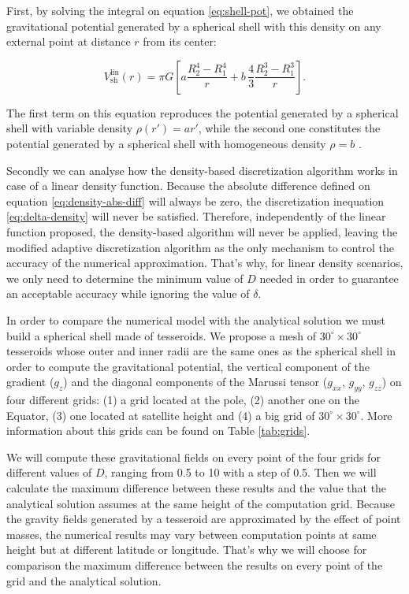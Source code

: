\documentclass[extra]{gji}
\begin{document}
First, by solving the integral on equation \ref{eq:shell-pot}, we obtained the
gravitational potential generated by a spherical shell with this density on
any external point at distance $r$ from its center:

\begin{equation}
    V_\text{sh}^\text{lin}(r) = \pi G \left[
    a \frac{R_2^4 - R_1^4}{r} +
    b \,\frac{4}{3} \frac{R_2^3 - R_1^3}{r} \right].
    \label{eq:shell-pot-linear}
\end{equation}

\noindent The first term on this equation reproduces the potential generated
by a spherical shell with variable density $\rho(r') = ar'$, while the second
one constitutes the potential generated by a spherical shell with homogeneous
density $\rho = b$ \citep{Mikuska2006,Grombein2013}.

Secondly we can analyse how the density-based discretization algorithm
works in case of a linear density function.
Because the absolute difference defined on equation
\ref{eq:density-abs-diff} will always be zero, the discretization
inequation \ref{eq:delta-density} will never be satisfied.
Therefore, independently of the linear function proposed, the
density-based algorithm will never be applied, leaving the modified
adaptive discretization algorithm as the only mechanism to control the
accuracy of the numerical approximation.
That's why, for linear density scenarios, we only need to determine
the minimum value of $D$ needed in order to guarantee an acceptable
accuracy while ignoring the value of $\delta$.

In order to compare the numerical model with the analytical solution we
must build a spherical shell made of tesseroids.
We propose a mesh of $30^\circ \times 30^\circ$ tesseroids whose outer and
inner radii are the same ones as the spherical shell in order to compute
the gravitational potential, the vertical component of the gradient
($g_z$) and the diagonal components of the Marussi tensor ($g_{xx}$,
$g_{yy}$, $g_{zz}$) on four different grids: (1) a grid located at the
pole, (2) another one on the Equator, (3) one located at satellite
height and (4) a big grid of $30^\circ \times 30^\circ$.
More information about this grids can be found on Table
\ref{tab:grids}.

We will compute these gravitational fields on every point of the four
grids for different values of $D$, ranging from 0.5 to 10 with a step
of 0.5.
Then we will calculate the maximum difference between these results and the
value that the analytical solution assumes at the same height of the
computation grid.
Because the gravity fields generated by a tesseroid are approximated by
the effect of point masses, the numerical results may vary between
computation points at same height but at different latitude or
longitude.
That's why we will choose for comparison the maximum difference between the
results on every point of the grid and the analytical solution.
\end{document}
